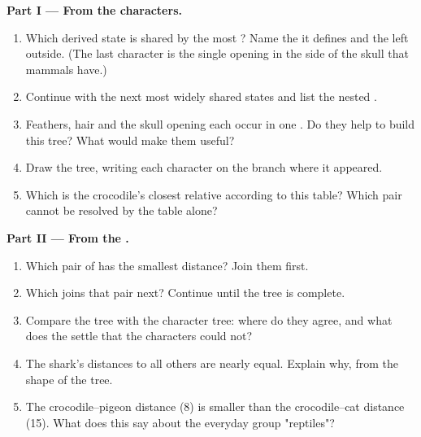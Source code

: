 \begin{problem}
\medskip
\noindent\textbf{Part I --- From the characters.}
\begin{enumerate}
  \item Which derived state is shared by the most ? Name the
         it defines and the  left outside. (The last
        character is the single opening in the side of the skull
        that mammals have.)
  \item Continue with the next most widely shared states and list the
        nested .
  \item Feathers, hair and the skull opening each occur in one .
        Do they help to build this tree? What would make them useful?
  \item Draw the tree, writing each character on the branch where it
        appeared.
  \item Which  is the crocodile's closest relative according to
        this table? Which pair cannot be resolved by the table alone?
\end{enumerate}

\medskip
\noindent\textbf{Part II --- From the .}
\begin{enumerate}[resume]
  \item Which pair of  has the smallest distance? Join them
        first.
  \item Which  joins that pair next? Continue until the tree is
        complete.
  \item Compare the  tree with the character tree: where do they
        agree, and what does the  settle that the characters could
        not?
  \item The shark's distances to all others are nearly equal. Explain
        why, from the shape of the tree.
  \item The crocodile--pigeon distance (8) is smaller than the
        crocodile--cat distance (15). What does this say about the
        everyday group "reptiles"?
\end{enumerate}


\end{problem}
